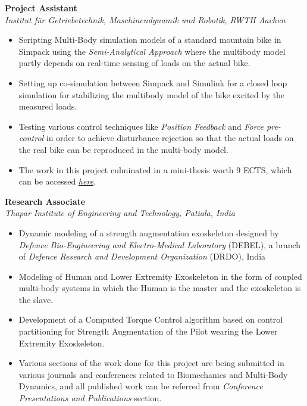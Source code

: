 \vspace{0.1 in}

\large{\textbf{Project Assistant}}
\hfill
\minithesisdate\\
\emph{\large{Institut für Getriebetechnik, Maschinendynamik und Robotik, RWTH Aachen}}
\begin{itemize}
\item \large{Scripting Multi-Body simulation models of a standard mountain bike in Simpack using the \emph{Semi-Analytical Approach} where the multibody model partly depends on real-time sensing of loads on the actual bike.}
\item\large{Setting up co-simulation between Simpack and Simulink for a closed loop simulation for stabilizing the multibody model of the bike excited by the measured loads.}
\item\large{Testing various control techniques like \emph{Position Feedback} and \emph{Force pre-control} in order to achieve disturbance rejection so that the actual loads on the real bike can be reproduced in the multi-body model}.
\item\large{The work in this project culminated in a mini-thesis worth 9 ECTS, which can be accessed \href{https://github.com/average-engineer/MiniThesis_IGMR/blob/master/Thesis.pdf}{\large{\textit{here}}}.}
\end{itemize}

\vspace{0.1 in}

\large{\textbf{Research Associate}}
\hfill
\drdodate\\
\emph{\large{Thapar Institute of Engineering and Technology, Patiala, India}}
\begin{itemize}
\item \large{Dynamic modeling of a strength augmentation exoskeleton designed by \emph{Defence Bio-Engineering and Electro-Medical Laboratory} (DEBEL), a branch of \emph{Defence Research and Development Organization} (DRDO), India}
\item\large{Modeling of Human and Lower Extremity Exoskeleton in the form of coupled multi-body systems in which the Human is the master and the exoskeleton is the slave.}
\item\large{Development of a Computed Torque Control algorithm based on control partitioning for Strength Augmentation of the Pilot wearing the Lower Extremity Exoskeleton.}
\item\large{Various sections of the work done for this project are being submitted in various journals and conferences related to Biomechanics and Multi-Body Dynamics, and all published work can be referred from \emph{Conference Presentations and Publications} section.}
\end{itemize}


